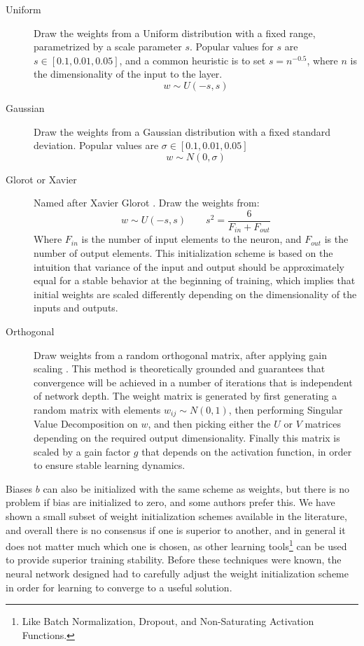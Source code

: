 \begin{description}
	\item[Uniform] Draw the weights from a Uniform distribution with a fixed range, parametrized by a scale parameter $s$. Popular values for $s$ are $s \in [0.1, 0.01, 0.05]$, and a common heuristic is to set $s = n^{-0.5}$, where $n$ is the dimensionality of the input to the layer.
        \vspace*{1em}
		\begin{equation}
			w \sim U(-s, s)
		\end{equation}
	\item[Gaussian] Draw the weights from a Gaussian distribution with a fixed standard deviation. Popular values are $\sigma \in [0.1, 0.01, 0.05]$
        \vspace*{1em}
		\begin{equation}
			w \sim N(0, \sigma)
		\end{equation}
	\item[Glorot or Xavier] Named after Xavier Glorot \cite{glorot2010understanding}. Draw the weights from:
		\begin{equation}
			w \sim U(-s, s) \qquad s^2 = \frac{6}{F_{in} + F_{out}}
		\end{equation}
         Where $F_{in}$ is the number of input elements to the neuron, and $F_{out}$ is the number of output elements. This initialization scheme is based on the intuition that variance of the input and output should be approximately equal for a stable behavior at the beginning of training, which implies that initial weights are scaled differently depending on the dimensionality of the inputs and outputs.
	\item[Orthogonal] Draw weights from a random orthogonal matrix, after applying gain scaling \cite[-6em]{saxe2013exact}. This method is theoretically grounded and guarantees that convergence will be achieved in a number of iterations that is independent of network depth. The weight matrix is generated by first generating a random matrix with elements $w_{ij} \sim N(0, 1)$, then performing Singular Value Decomposition on $w$, and then picking either the $U$ or $V$ matrices depending on the required output dimensionality. Finally this matrix is scaled by a gain factor $g$ that depends on the activation function, in order to ensure stable learning dynamics.
\end{description}

Biases $b$ can also be initialized with the same scheme as weights, but there is no problem if bias are initialized to zero, and some authors prefer this. We have shown a small subset of weight initialization schemes available in the literature, and overall there is no consensus if one is superior to another, and in general it does not matter much which one is chosen, as other learning tools\footnote{Like Batch Normalization, Dropout, and Non-Saturating Activation Functions.} can be used to provide superior training stability. Before these techniques were known, the neural network designed had to carefully adjust the weight initialization scheme in order for learning to converge to a useful solution.

